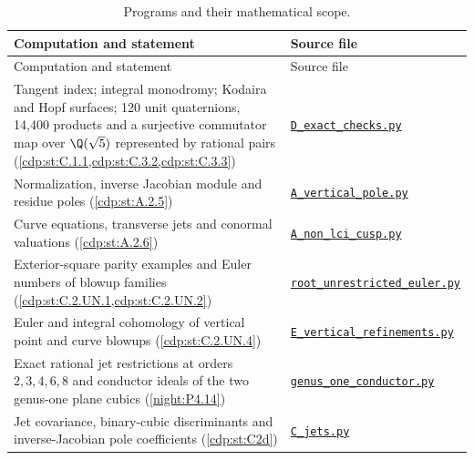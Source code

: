\begin{longtable}{@{}>{\raggedright\arraybackslash}p{}>{\raggedright\arraybackslash}p{}@{}}
\caption{Programs and their mathematical scope.}\label{tab:II:programs}\\
\toprule Computation and statement & Source file \\
\midrule\endfirsthead
\toprule Computation and statement & Source file \\
\midrule\endhead
\bottomrule\endfoot
Tangent index; integral monodromy; Kodaira and Hopf surfaces; 120 unit quaternions, 14,400 products and a surjective commutator map over $\Q(\sqrt5)$ represented by rational pairs (\cref{cdp:st:C.1.1,cdp:st:C.3.2,cdp:st:C.3.3}) & \href{https://raw.githubusercontent.com/KokunoYumeto/s6-complex-structure-workbench/\SsixRepositoryCommit/pro_returns/S6_03_CDP_checkpoint_13_20261116T0136Z/S6_03_CDP/code/D_exact_checks.py}{\nolinkurl{D_exact_checks.py}} \\[3pt]
Normalization, inverse Jacobian module and residue poles (\cref{cdp:st:A.2.5}) & \href{https://raw.githubusercontent.com/KokunoYumeto/s6-complex-structure-workbench/\SsixRepositoryCommit/pro_returns/S6_03_CDP_checkpoint_13_20261116T0136Z/S6_03_CDP/code/A_vertical_pole.py}{\nolinkurl{A_vertical_pole.py}} \\[3pt]
Curve equations, transverse jets and conormal valuations (\cref{cdp:st:A.2.6}) & \href{https://raw.githubusercontent.com/KokunoYumeto/s6-complex-structure-workbench/\SsixRepositoryCommit/pro_returns/S6_03_CDP_checkpoint_13_20261116T0136Z/S6_03_CDP/code/A_non_lci_cusp.py}{\nolinkurl{A_non_lci_cusp.py}} \\[3pt]
Exterior-square parity examples and Euler numbers of blowup families (\cref{cdp:st:C.2.UN.1,cdp:st:C.2.UN.2}) & \href{https://raw.githubusercontent.com/KokunoYumeto/s6-complex-structure-workbench/\SsixRepositoryCommit/pro_returns/S6_03_CDP_checkpoint_13_20261116T0136Z/S6_03_CDP/code/root_unrestricted_euler.py}{\nolinkurl{root_unrestricted_euler.py}} \\[3pt]
Euler and integral cohomology of vertical point and curve blowups (\cref{cdp:st:C.2.UN.4}) & \href{https://raw.githubusercontent.com/KokunoYumeto/s6-complex-structure-workbench/\SsixRepositoryCommit/pro_returns/S6_03_CDP_checkpoint_13_20261116T0136Z/S6_03_CDP/code/E_vertical_refinements.py}{\nolinkurl{E_vertical_refinements.py}} \\[3pt]
Exact rational jet restrictions at orders $2,3,4,6,8$ and conductor ideals of the two genus-one plane cubics (\cref{night:P4.14}) & \href{https://raw.githubusercontent.com/KokunoYumeto/s6-complex-structure-workbench/\SsixRepositoryCommit/pro_returns/S6_06_BLIND_checkpoint_15_20261117T1457Z/S6_06_BLIND/code/part4/genus_one_conductor.py}{\nolinkurl{genus_one_conductor.py}} \\[3pt]
Jet covariance, binary-cubic discriminants and inverse-Jacobian pole coefficients (\cref{cdp:st:C2d}) & \href{https://raw.githubusercontent.com/KokunoYumeto/s6-complex-structure-workbench/\SsixRepositoryCommit/pro_returns/S6_03_CDP_checkpoint_13_20261116T0136Z/S6_03_CDP/code/C_jets.py}{\nolinkurl{C_jets.py}} \\[3pt]
\end{longtable}